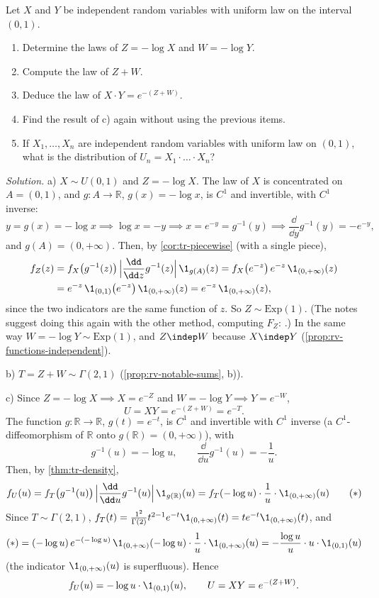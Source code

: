 \begin{example}\label{exa:rv-uniform-products}
Let $X$ and $Y$ be independent random variables with uniform law on the interval $(0,1)$.
\begin{enumerate}[label=\alph*)]
  \item Determine the laws of $Z=-\log X$ and $W=-\log Y$.
  \item Compute the law of $Z+W$.
  \item Deduce the law of $X\cdot Y=e^{-(Z+W)}$.
  \item Find the result of c) again without using the previous items.
  \item If $X_1,\dots,X_n$ are independent random variables with uniform law on $(0,1)$, what is
    the distribution of $U_n=X_1\cdot\ldots\cdot X_n$?
\end{enumerate}

\emph{Solution.} a) $X\sim U(0,1)$ and $Z=-\log X$. The law of $X$ is concentrated on $A=(0,1)$, and
$g:A\to\mathbb R$, $g(x)=-\log x$, is $C^1$ and invertible, with $C^1$ inverse:
\[
  y=g(x)=-\log x\implies\log x=-y\implies x=e^{-y}=g^{-1}(y)\implies\frac{\dd}{\dd y}g^{-1}(y)=-e^{-y},
\]
and $g(A)=(0,+\infty)$. Then, by \cref{cor:tr-piecewise} (with a single piece),
\[
\begin{aligned}
  f_Z(z)&=f_X\big(g^{-1}(z)\big)\,\Big|\frac{\dd}{\dd z}g^{-1}(z)\Big|\,\1_{g(A)}(z)=f_X\big(e^{-z}\big)\,e^{-z}\,\1_{(0,+\infty)}(z)\\
  &=e^{-z}\,\1_{(0,1)}\big(e^{-z}\big)\,\1_{(0,+\infty)}(z)=e^{-z}\,\1_{(0,+\infty)}(z),
\end{aligned}
\]
since the two indicators are the same function of $z$. So $Z\sim\mathrm{Exp}(1)$. (The notes suggest
doing this again with the other method, computing $F_Z$: .) In the same
way $W=-\log Y\sim\mathrm{Exp}(1)$, and $Z\indep W$ because $X\indep Y$
(\cref{prop:rv-functions-independent}).

b) $T=Z+W\sim\Gamma(2,1)$ (\cref{prop:rv-notable-sums}, b)).

c) Since $Z=-\log X\implies X=e^{-Z}$ and $W=-\log Y\implies Y=e^{-W}$,
\[
  U=XY=e^{-(Z+W)}=e^{-T}.
\]
The function $g:\mathbb R\to\mathbb R$, $g(t)=e^{-t}$, is $C^1$ and invertible with $C^1$ inverse (a
$C^1$-diffeomorphism of $\mathbb R$ onto $g(\mathbb R)=(0,+\infty)$), with
\[
  g^{-1}(u)=-\log u,\qquad\frac{\dd}{\dd u}g^{-1}(u)=-\frac1u .
\]
Then, by \cref{thm:tr-density},
\[
  f_U(u)=f_T\big(g^{-1}(u)\big)\,\Big|\frac{\dd}{\dd u}g^{-1}(u)\Big|\,\1_{g(\mathbb R)}(u)
  =f_T(-\log u)\cdot\frac1u\cdot\1_{(0,+\infty)}(u)\qquad(*)
\]
Since $T\sim\Gamma(2,1)$, $f_T(t)=\frac{1^2}{\Gamma(2)}t^{2-1}e^{-t}\1_{(0,+\infty)}(t)=te^{-t}\1_{(0,+\infty)}(t)$, and
\[
  (*)=(-\log u)\,e^{-(-\log u)}\,\1_{(0,+\infty)}(-\log u)\cdot\frac1u\cdot\1_{(0,+\infty)}(u)
  =-\frac{\log u}{u}\cdot u\cdot\1_{(0,1)}(u)
\]
(the indicator $\1_{(0,+\infty)}(u)$ is superfluous). Hence
\[
  f_U(u)=-\log u\cdot\1_{(0,1)}(u),\qquad U=XY=e^{-(Z+W)}.
\]


\end{example}
